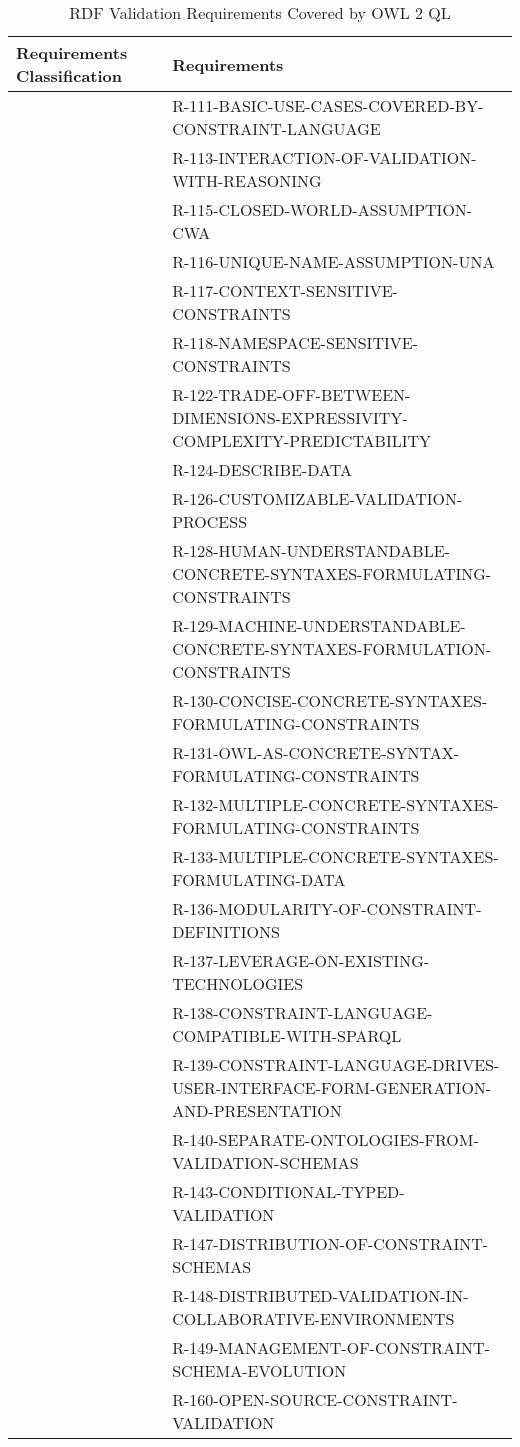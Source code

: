 \documentclass{llncs}
\newcommand{\hr}{\hline\noalign{\smallskip}} %
\begin{document}
\begin{table}
\caption{RDF Validation Requirements Covered by OWL 2 QL}
\label{tab:RequirementsCoveredOWL2QL}
\centering
\begin{tabular}{ll}
\hr
Requirements Classification & Requirements \\
\hr
& R-111-BASIC-USE-CASES-COVERED-BY-CONSTRAINT-LANGUAGE \\
& R-113-INTERACTION-OF-VALIDATION-WITH-REASONING \\
& R-115-CLOSED-WORLD-ASSUMPTION-CWA \\
& R-116-UNIQUE-NAME-ASSUMPTION-UNA \\
& R-117-CONTEXT-SENSITIVE-CONSTRAINTS \\
& R-118-NAMESPACE-SENSITIVE-CONSTRAINTS \\
& R-122-TRADE-OFF-BETWEEN-DIMENSIONS-EXPRESSIVITY-COMPLEXITY-PREDICTABILITY \\
& R-124-DESCRIBE-DATA \\
& R-126-CUSTOMIZABLE-VALIDATION-PROCESS \\
& R-128-HUMAN-UNDERSTANDABLE-CONCRETE-SYNTAXES-FORMULATING-CONSTRAINTS \\
& R-129-MACHINE-UNDERSTANDABLE-CONCRETE-SYNTAXES-FORMULATION-CONSTRAINTS \\
& R-130-CONCISE-CONCRETE-SYNTAXES-FORMULATING-CONSTRAINTS \\
& R-131-OWL-AS-CONCRETE-SYNTAX-FORMULATING-CONSTRAINTS \\
& R-132-MULTIPLE-CONCRETE-SYNTAXES-FORMULATING-CONSTRAINTS \\
& R-133-MULTIPLE-CONCRETE-SYNTAXES-FORMULATING-DATA \\
& R-136-MODULARITY-OF-CONSTRAINT-DEFINITIONS \\
& R-137-LEVERAGE-ON-EXISTING-TECHNOLOGIES \\
& R-138-CONSTRAINT-LANGUAGE-COMPATIBLE-WITH-SPARQL \\
& R-139-CONSTRAINT-LANGUAGE-DRIVES-USER-INTERFACE-FORM-GENERATION-AND-PRESENTATION \\
& R-140-SEPARATE-ONTOLOGIES-FROM-VALIDATION-SCHEMAS \\
& R-143-CONDITIONAL-TYPED-VALIDATION \\
& R-147-DISTRIBUTION-OF-CONSTRAINT-SCHEMAS \\
& R-148-DISTRIBUTED-VALIDATION-IN-COLLABORATIVE-ENVIRONMENTS \\
& R-149-MANAGEMENT-OF-CONSTRAINT-SCHEMA-EVOLUTION \\
& R-160-OPEN-SOURCE-CONSTRAINT-VALIDATION \\

\end{tabular}
\end{table}
\end{document}

